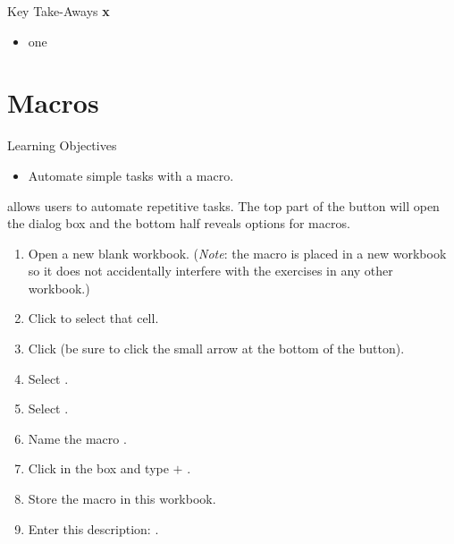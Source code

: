 \begin{center}
	\begin{tkwbox}{Key Take-Aways}
		\textbf{x}
		\\
		\begin{itemize}
			\setlength{\itemsep}{0pt}
			\setlength{\parskip}{0pt}
			\setlength{\parsep}{0pt}
			
			\item one
			
		\end{itemize}
	\end{tkwbox}
\end{center}

\section{Macros}

\begin{center}
	\begin{objbox}{Learning Objectives}
		\begin{itemize}
			\setlength{\itemsep}{0pt}
			\setlength{\parskip}{0pt}
			\setlength{\parsep}{0pt}
			
			\item Automate simple tasks with a macro.
			
		\end{itemize}
	\end{objbox}
\end{center}

 allows users to automate repetitive tasks. The top part of the button will open the  dialog box and the bottom half reveals options for macros. 

\begin{enumerate}
	\item Open a new blank workbook. (\textit{Note}: the macro is placed in a new workbook so it does not accidentally interfere with the exercises in any other workbook.)
	\item Click  to select that cell.
	\item Click  (be sure to click the small arrow at the bottom of the  button).
	\item Select .
	\item Select .
	\item Name the macro .
	\item Click in the  box and type  $ + $ .
	\item Store the macro in this workbook.
	\item Enter this description: .
\end{enumerate}

